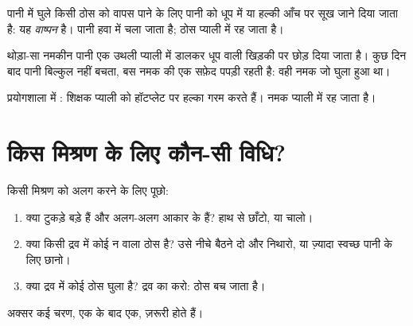 \begin{definition}[वाष्पन]\label{def:g3:separating-mixtures:evaporate}
पानी में घुले किसी ठोस को वापस पाने के लिए पानी को धूप में या हल्की
आँच पर सूख जाने दिया जाता है: यह
\emph{वाष्पन} है। पानी हवा में चला जाता है; ठोस
प्याली में रह जाता है।
\end{definition}

\begin{example}\label{ex:g3:separating-mixtures:salt}
थोड़ा-सा नमकीन पानी एक उथली प्याली में डालकर धूप वाली खिड़की पर छोड़ दिया
जाता है। कुछ दिन बाद पानी बिल्कुल नहीं बचता, बस नमक की एक सफ़ेद पपड़ी
रहती है: वही नमक जो घुला हुआ था।
\end{example}

\begin{omfigure}

{\small प्रयोगशाला में : शिक्षक प्याली को हॉटप्लेट पर हल्का गरम
करते हैं। नमक प्याली में रह जाता है।}
\end{omfigure}

\section{किस मिश्रण के लिए कौन-सी विधि?}

\begin{method}\label{met:g3:separating-mixtures:choose}
किसी मिश्रण को अलग करने के लिए पूछो:
\begin{enumerate}
  \item क्या टुकड़े बड़े हैं और अलग-अलग आकार के हैं? हाथ से छाँटो, या
        चालो।
  \item क्या किसी द्रव में कोई न  वाला ठोस है? उसे नीचे बैठने दो और
        निथारो, या ज़्यादा स्वच्छ पानी के लिए छानो।
  \item क्या द्रव में कोई ठोस घुला है? द्रव का  करो:
        ठोस बच जाता है।
\end{enumerate}
अक्सर कई चरण, एक के बाद एक, ज़रूरी होते हैं।
\end{method}


